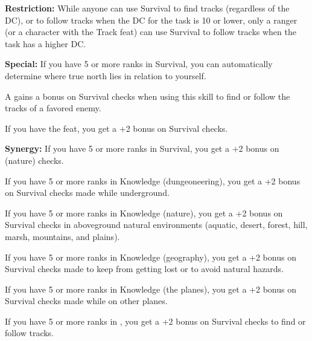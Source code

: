 \textbf{Restriction:} While anyone can use Survival to find tracks (regardless 
of the DC), or to follow tracks when the DC for the task is 10 or lower, only a 
ranger (or a character with the Track feat) can use Survival to follow tracks when 
the task has a higher DC.

\textbf{Special:} If you have 5 or more ranks in Survival, you can automatically 
determine where true north lies in relation to yourself.

A  gains a bonus on Survival checks when using this skill to find or follow 
the tracks of a favored enemy.

If you have the  feat, you get a +2 bonus on Survival checks.

\textbf{Synergy:} If you have 5 or more ranks in Survival, you get a +2 bonus on 
 (nature) checks.

If you have 5 or more ranks in Knowledge (dungeoneering), you get a +2 bonus on 
Survival checks made while underground.

If you have 5 or more ranks in Knowledge (nature), you get a +2 bonus on Survival 
checks in aboveground natural environments (aquatic, desert, forest, hill, marsh, 
mountains, and plains).

If you have 5 or more ranks in Knowledge (geography), you get a +2 bonus on Survival 
checks made to keep from getting lost or to avoid natural hazards.

If you have 5 or more ranks in Knowledge (the planes), you get a +2 bonus on Survival 
checks made while on other planes.

If you have 5 or more ranks in , you get a +2 bonus on Survival checks to 
find or follow tracks.
